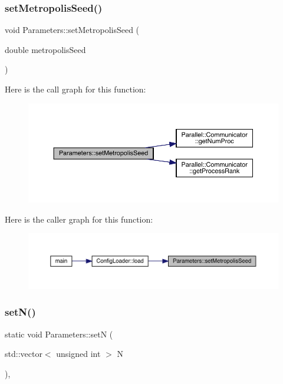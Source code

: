 \subsubsection{\texorpdfstring{setMetropolisSeed()}{setMetropolisSeed()}}
{\footnotesize\ttfamily void Parameters\+::set\+Metropolis\+Seed (\begin{DoxyParamCaption}\item[{double}]{metropolis\+Seed }\end{DoxyParamCaption})\hspace{0.3cm}{\ttfamily [static]}}

Here is the call graph for this function\+:\nopagebreak
\begin{figure}[H]
\begin{center}
\leavevmode
\includegraphics[width=350pt]{class_parameters_ace3967a0ee49901f55e9de69e0a96117_cgraph}
\end{center}
\end{figure}
Here is the caller graph for this function\+:\nopagebreak
\begin{figure}[H]
\begin{center}
\leavevmode
\includegraphics[width=350pt]{class_parameters_ace3967a0ee49901f55e9de69e0a96117_icgraph}
\end{center}
\end{figure}
\mbox{\label{class_parameters_a0e0118ebbe8f19148a5c6d737c7a2c85}} 
\subsubsection{\texorpdfstring{setN()}{setN()}}
{\footnotesize\ttfamily static void Parameters\+::setN (\begin{DoxyParamCaption}\item[{std\+::vector$<$ unsigned int $>$}]{N }\end{DoxyParamCaption})\hspace{0.3cm}{\ttfamily [inline]}, {\ttfamily [static]}}

